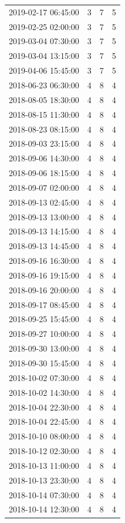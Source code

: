 \begin{tabular}{lrrr}
2019-02-17 06:45:00 & 3 & 7 & 5 \\
2019-02-25 02:00:00 & 3 & 7 & 5 \\
2019-03-04 07:30:00 & 3 & 7 & 5 \\
2019-03-04 13:15:00 & 3 & 7 & 5 \\
2019-04-06 15:45:00 & 3 & 7 & 5 \\
2018-06-23 06:30:00 & 4 & 8 & 4 \\
2018-08-05 18:30:00 & 4 & 8 & 4 \\
2018-08-15 11:30:00 & 4 & 8 & 4 \\
2018-08-23 08:15:00 & 4 & 8 & 4 \\
2018-09-03 23:15:00 & 4 & 8 & 4 \\
2018-09-06 14:30:00 & 4 & 8 & 4 \\
2018-09-06 18:15:00 & 4 & 8 & 4 \\
2018-09-07 02:00:00 & 4 & 8 & 4 \\
2018-09-13 02:45:00 & 4 & 8 & 4 \\
2018-09-13 13:00:00 & 4 & 8 & 4 \\
2018-09-13 14:15:00 & 4 & 8 & 4 \\
2018-09-13 14:45:00 & 4 & 8 & 4 \\
2018-09-16 16:30:00 & 4 & 8 & 4 \\
2018-09-16 19:15:00 & 4 & 8 & 4 \\
2018-09-16 20:00:00 & 4 & 8 & 4 \\
2018-09-17 08:45:00 & 4 & 8 & 4 \\
2018-09-25 15:45:00 & 4 & 8 & 4 \\
2018-09-27 10:00:00 & 4 & 8 & 4 \\
2018-09-30 13:00:00 & 4 & 8 & 4 \\
2018-09-30 15:45:00 & 4 & 8 & 4 \\
2018-10-02 07:30:00 & 4 & 8 & 4 \\
2018-10-02 14:30:00 & 4 & 8 & 4 \\
2018-10-04 22:30:00 & 4 & 8 & 4 \\
2018-10-04 22:45:00 & 4 & 8 & 4 \\
2018-10-10 08:00:00 & 4 & 8 & 4 \\
2018-10-12 02:30:00 & 4 & 8 & 4 \\
2018-10-13 11:00:00 & 4 & 8 & 4 \\
2018-10-13 23:30:00 & 4 & 8 & 4 \\
2018-10-14 07:30:00 & 4 & 8 & 4 \\
2018-10-14 12:30:00 & 4 & 8 & 4 \\

\end{tabular}
